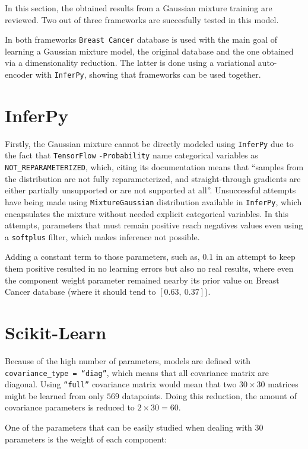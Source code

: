 
In this section, the obtained results from a Gaussian mixture training are reviewed. Two out of three frameworks are succesfully tested in this model.

In both frameworks \texttt{Breast Cancer} database is used with the main goal of learning a Gaussian mixture model, the original database and the one obtained via a dimensionality reduction. The latter is done using a variational auto-encoder with \texttt{InferPy}, showing that frameworks can be used together.

\section{InferPy}

Firstly, the Gaussian mixture cannot be directly modeled using \texttt{InferPy} due to the fact that \texttt{TensorFlow} \texttt{-Probability} name categorical variables as \texttt{NOT\_REPARAMETERIZED}, which, citing its documentation means that ``samples from the distribution are not fully reparameterized, and straight-through gradients are either partially unsupported or are not supported at all''. Unsuccessful attempts have being made using \texttt{MixtureGaussian} distribution available in \texttt{InferPy}, which encapsulates the mixture without needed explicit categorical variables. In this attempts, parameters that must remain positive reach negatives values even using a \texttt{softplus} filter, which makes inference not possible.

Adding a constant term to those parameters, such as, \(0.1\) in an attempt to keep them positive resulted in no learning errors but also no real results, where even the component weight parameter remained nearby its prior value on Breast Cancer database (where it should tend to \([0.63,\ 0.37]\)).


\section{Scikit-Learn}

Because of the high number of parameters, models are defined with \texttt{covariance\_type = ``diag''}, which means that all covariance matrix are diagonal. Using \texttt{``full''} covariance matrix would mean that two \(30 \times 30\) matrices might be learned from only \(569\) datapoints. Doing this reduction, the amount of covariance parameters is reduced to \(2\times 30 = 60\).

One of the parameters that can be easily studied when dealing with \(30\) parameters is the weight of each component:

